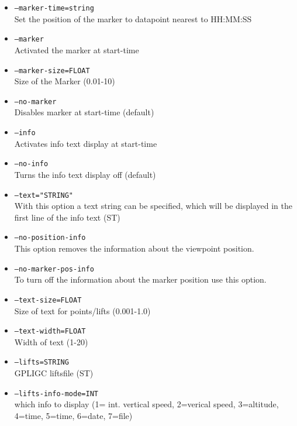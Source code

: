 \begin{itemize}
\item \texttt{--marker-time=string } \\
Set the position of the marker to datapoint nearest to HH:MM:SS

\item \texttt{--marker } \\
Activated the marker at start-time

\item \texttt{--marker-size=FLOAT}\\
Size of the Marker (0.01-10)

\item \texttt{--no-marker} \\
Disables marker at start-time (default)

\item \texttt{--info} \\
Activates info text display at start-time

\item \texttt{--no-info} \\
Turns the info text display off (default)

\item \texttt{--text="STRING"} \\
With this option a text string can be specified, which will be displayed
in the first line of the info text (ST)

\item \texttt{--no-position-info}\\
This option removes the information about the viewpoint position.

\item \texttt{--no-marker-pos-info}\\
To turn off the information about the marker position use this option.

\item \texttt{--text-size=FLOAT}\\
Size of text for points/lifts (0.001-1.0)

\item \texttt{--text-width=FLOAT}\\Width of text (1-20)

\item \texttt{--lifts=STRING}\\GPLIGC liftsfile (ST)

\item \texttt{--lifts-info-mode=INT}\\which info to display (1= int. vertical speed, 2=verical speed, 3=altitude, 4=time, 5=time, 6=date, 7=file)



\end{itemize}
